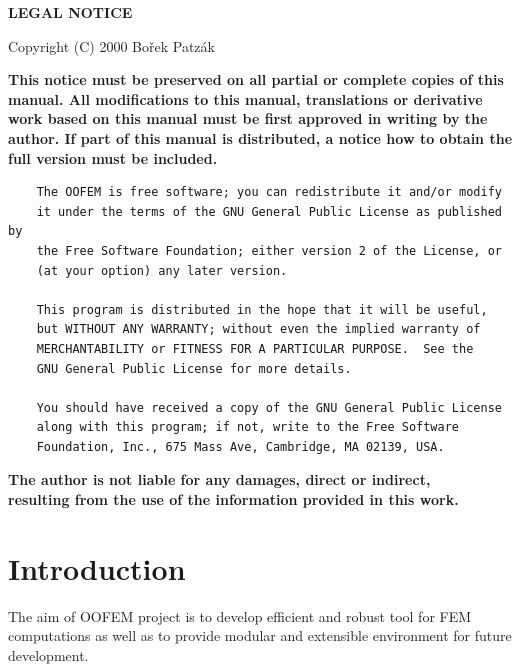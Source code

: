 \documentclass[a4paper]{article}
\begin{document}
\latex{\clearpage}
\html{\newline\newline\htmlrule\newline}
\begin{center}
{\large \bf LEGAL NOTICE}
\end{center}\vspace*{1cm}
\centerline{Copyright (C) 2000 Bo\v{r}ek Patz\'{a}k}\vspace{1cm}
\begin{center}
{\bf This notice must be preserved on all partial or complete copies
of this manual. All modifications to this manual, translations or
derivative work based on this manual must be first approved in writing
by the author. If part of this manual is distributed, a notice how to
obtain the full version must be included.}\\

\begin{verbatim}
    The OOFEM is free software; you can redistribute it and/or modify
    it under the terms of the GNU General Public License as published by
    the Free Software Foundation; either version 2 of the License, or
    (at your option) any later version.

    This program is distributed in the hope that it will be useful,
    but WITHOUT ANY WARRANTY; without even the implied warranty of
    MERCHANTABILITY or FITNESS FOR A PARTICULAR PURPOSE.  See the
    GNU General Public License for more details.

    You should have received a copy of the GNU General Public License
    along with this program; if not, write to the Free Software
    Foundation, Inc., 675 Mass Ave, Cambridge, MA 02139, USA.                                                               
\end{verbatim}

{\bf The author is not liable for any damages, direct or indirect,\\
resulting from the use of the information provided in this work.}
\end{center}
\clearpage
\tableofcontents
\clearpage

\section{Introduction}

The aim of OOFEM project is to develop efficient and robust tool for
FEM computations as well as to provide modular and extensible
environment for future development.
\end{document}
